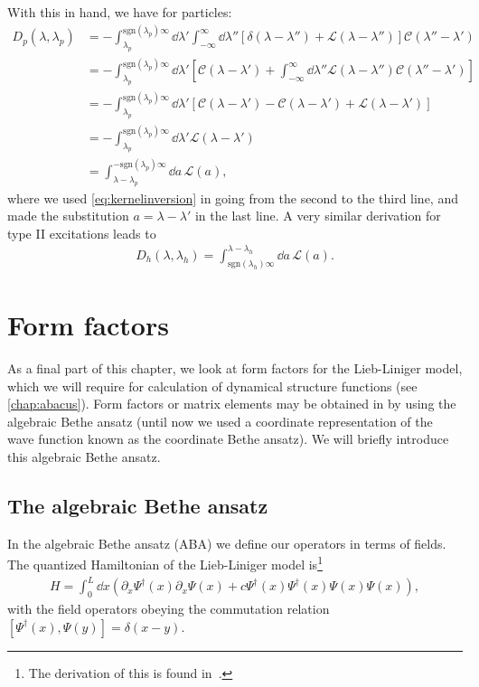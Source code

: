\documentclass[11pt, a4paper]{report} %
\begin{document}
With this in hand, we have for particles:
\begin{align}
	D_p(\lambda, \lambda_p) &= - \int_{\lambda_p}^{\textrm{sgn}(\lambda_p)\infty} \dd \lambda' \int_{-\infty}^{\infty} \dd  \lambda'' \left[\delta(\lambda-\lambda'') + \mathcal{L}(\lambda-\lambda'') \right]\mathcal{C}(\lambda''-\lambda')\\
	&= - \int_{\lambda_p}^{\textrm{sgn}(\lambda_p)\infty} \dd \lambda' \left[\mathcal{C}(\lambda-\lambda') + \int_{-\infty}^{\infty} \dd  \lambda'' \mathcal{L}(\lambda-\lambda'') \mathcal{C}(\lambda''-\lambda')\right]\\
	&= - \int_{\lambda_p}^{\textrm{sgn}(\lambda_p)\infty} \dd \lambda' \left[\mathcal{C}(\lambda-\lambda') - \mathcal{C}(\lambda-\lambda') + \mathcal{L}(\lambda-\lambda')\right]\\
	&= - \int_{\lambda_p}^{\textrm{sgn}(\lambda_p)\infty} \dd \lambda' \mathcal{L}(\lambda-\lambda')\\
	&=  \int_{\lambda-\lambda_p}^{-\textrm{sgn}(\lambda_p)\infty} \dd a \, \mathcal{L}(a),
\end{align}
where we used \cref{eq:kernelinversion} in going from the second to the third line, and made the substitution \(a = \lambda-\lambda'\) in the last line.
A very similar derivation for type II excitations leads to
\begin{align}
	D_h(\lambda,\lambda_h) = \int_{\textrm{sgn}(\lambda_h)\infty}^{\lambda-\lambda_h} \dd a\, \mathcal{L}(a).
\end{align}


\section{Form factors}
As a final part of this chapter, we look at form factors for the Lieb-Liniger model, which we will require for calculation of dynamical structure functions (see \cref{chap:abacus}).
Form factors or matrix elements may be obtained in by using the algebraic Bethe ansatz (until now we used a coordinate representation of the wave function known as the coordinate Bethe ansatz).
We will briefly introduce this algebraic Bethe ansatz. 

\subsection{The algebraic Bethe ansatz}

In the algebraic Bethe ansatz (ABA) we define our operators in terms of fields.
The quantized Hamiltonian of the Lieb-Liniger model is\footnote{The derivation of this is found in~\cite{feynman}.}
\begin{align}
  \label{eq:30}
  H = \int_0^L \dd x \left(\partial_x \Psi^{\dag}(x) \partial_x \Psi(x) + c \Psi^{\dag}(x)\Psi^{\dag}(x)\Psi(x)\Psi(x)\right),
\end{align}
with the field operators obeying the commutation relation \([\Psi^{\dag}(x),\Psi(y)] = \delta(x-y)\).
\end{document}
